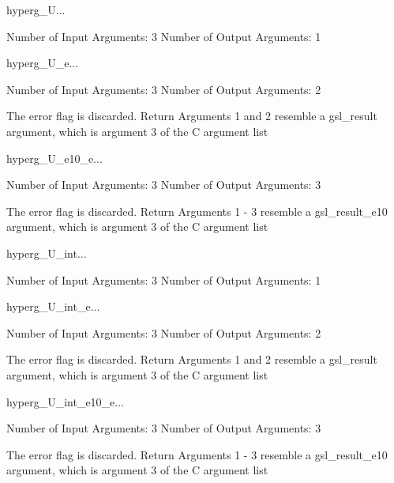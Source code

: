\begin{funcdesc}{hyperg_U}{...}

    Number of Input  Arguments:  3
    Number of Output Arguments:  1
\end{funcdesc}

\begin{funcdesc}{hyperg_U_e}{...}

    Number of Input  Arguments:  3
    Number of Output Arguments:  2

The error flag is discarded.
Return Arguments 1 and 2 resemble a gsl_result argument,
	which is  argument 3 of the C argument list

\end{funcdesc}

\begin{funcdesc}{hyperg_U_e10_e}{...}

    Number of Input  Arguments:  3
    Number of Output Arguments:  3

The error flag is discarded.
Return Arguments 1 - 3 resemble a gsl_result_e10 argument,
	which is argument 3 of the C argument list

\end{funcdesc}

\begin{funcdesc}{hyperg_U_int}{...}

    Number of Input  Arguments:  3
    Number of Output Arguments:  1
\end{funcdesc}

\begin{funcdesc}{hyperg_U_int_e}{...}

    Number of Input  Arguments:  3
    Number of Output Arguments:  2

The error flag is discarded.
Return Arguments 1 and 2 resemble a gsl_result argument,
	which is  argument 3 of the C argument list

\end{funcdesc}

\begin{funcdesc}{hyperg_U_int_e10_e}{...}

    Number of Input  Arguments:  3
    Number of Output Arguments:  3

The error flag is discarded.
Return Arguments 1 - 3 resemble a gsl_result_e10 argument,
	which is argument 3 of the C argument list

\end{funcdesc}

